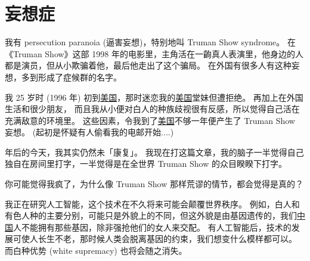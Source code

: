 \documentclass[12pt]{report}
\begin{document}

\tableofcontents
{}

\chapter{妄想症}

我有 persecution paranoia (逼害妄想)，特别地叫 Truman Show syndrome。 在《Truman Show》这部 1998 年的电影里，主角活在一齣真人表演里，他身边的人都是演员，但从小欺骗着他，最后他走出了这个骗局。 在外国有很多人有这种妄想，多到形成了症候群的名字。

我 25 岁时 (1996 年) 初到\uline{美国}，那时迷恋我的\uline{美国}堂妹但遭拒绝。 再加上在外国生活和很少朋友， 而且我从小便对白人的种族歧视很有反感，所以觉得自己活在充满敌意的环境里。 这些因素，令我到了\uline{美国}不够一年便产生了 Truman Show 妄想。 (起初是怀疑有人偷看我的电邮开始....)

\resultb 年后的今天，我其实仍然未「康复」。 我现在打这篇文章，我的脑子一半觉得自己独自在房间里打字，一半觉得是在全世界 Truman Show 的众目睽睽下打字。

你可能觉得我疯了，为什么像 Truman Show 那样荒谬的情节，都会觉得是真的？

我正在研究人工智能，这个技术在不久将来可能会颠覆世界秩序。 例如，白人和有色人种的主要分别，可能只是外貌上的不同，但这外貌是由基因遗传的，我们\uline{中国}人不能拥有那些基因，除非强抢他们的女人来交配。 有人工智能后，技术的发展可使人长生不老，那时候人类会脱离基因的约束，我们想变什么模样都可以。 而白种优势 (white supremacy) 也将会随之消失。
\end{document}
